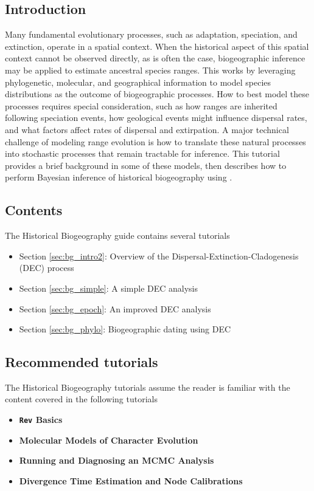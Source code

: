 \subsection{Introduction}

Many fundamental evolutionary processes, such as adaptation, speciation, and extinction, operate in a spatial context. 
When the historical aspect of this spatial context cannot be observed directly, as is often the case, biogeographic inference may be applied to estimate ancestral species ranges.
This works by leveraging phylogenetic, molecular, and geographical information to model species distributions as the outcome of biogeographic processes.
How to best model these processes requires special consideration, such as how ranges are inherited following speciation events, how geological events might influence dispersal rates, and what factors affect rates of dispersal and extirpation.
A major technical challenge of modeling range evolution is how to translate these natural processes into stochastic processes that remain tractable for inference.
This tutorial provides a brief background in some of these models, then describes how to perform Bayesian inference of historical biogeography using \RevBayes.

\subsection{Contents}

The Historical Biogeography guide contains several tutorials

\begin{itemize}
\item Section \ref{sec:bg_intro2}: Overview of the Dispersal-Extinction-Cladogenesis (DEC) process
\item Section \ref{sec:bg_simple}: A simple DEC analysis
\item Section \ref{sec:bg_epoch}: An improved DEC analysis
\item Section \ref{sec:bg_phylo}: Biogeographic dating using DEC
\end{itemize}

\subsection{Recommended tutorials}

The Historical Biogeography tutorials assume the reader is familiar with the content covered in the following \RevBayes tutorials

\begin{itemize}
\item {\bf {\tt \large Rev} Basics}
\item {\bf Molecular Models of Character Evolution}
\item {\bf Running and Diagnosing an MCMC Analysis}
\item {\bf Divergence Time Estimation and Node Calibrations}
\end{itemize}

\newpage
